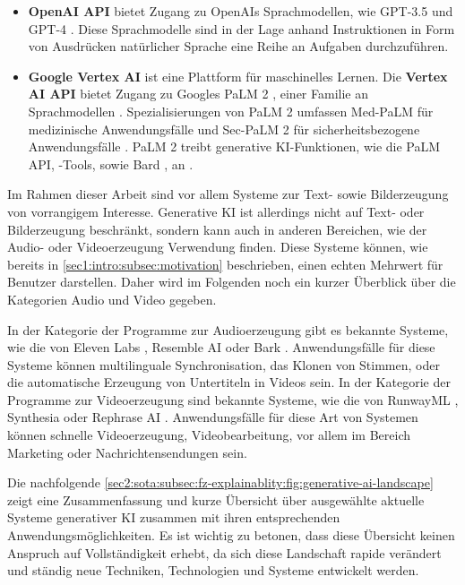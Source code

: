 \begin{itemize}
    \item \textbf{OpenAI API} bietet Zugang zu OpenAIs Sprachmodellen, wie GPT-3.5 \cite{openai-gpt-sep-2021} und GPT-4 \cite{openai-gpt-sep-2021}.
    Diese Sprachmodelle sind in der Lage anhand Instruktionen in Form von Ausdrücken natürlicher Sprache eine Reihe an Aufgaben durchzuführen.
    \item \textbf{Google Vertex AI} ist eine Plattform für maschinelles Lernen.
    Die \textbf{Vertex AI API} bietet Zugang zu Googles PaLM 2 \cite{google-palm2-techreport}, einer Familie an Sprachmodellen \cite{google-blog-io-23}.
    Spezialisierungen von PaLM 2 umfassen Med-PaLM für medizinische Anwendungsfälle und Sec-PaLM 2 für sicherheitsbezogene Anwendungsfälle \cite{google-blog-io-23}.
    PaLM 2 treibt generative KI-Funktionen, wie die PaLM API, -Tools, sowie Bard \cite{google-bard}, an \cite{google-blog-io-23}.
\end{itemize}

Im Rahmen dieser Arbeit sind vor allem Systeme zur Text- sowie Bilderzeugung von vorrangigem Interesse.
Generative KI ist allerdings nicht auf Text- oder Bilderzeugung beschränkt, sondern kann auch in anderen Bereichen, wie der Audio- oder Videoerzeugung Verwendung finden.
Diese Systeme können, wie bereits in \cref{sec1:intro:subsec:motivation} beschrieben, einen echten Mehrwert für Benutzer darstellen.
Daher wird im Folgenden noch ein kurzer Überblick über die Kategorien Audio und Video gegeben.

In der Kategorie der Programme zur Audioerzeugung gibt es bekannte Systeme, wie die von Eleven Labs \cite{eleven-labs}, Resemble AI \cite{resemble-ai} oder Bark \cite{bark}.
Anwendungsfälle für diese Systeme können multilinguale Synchronisation, das Klonen von Stimmen, oder die automatische Erzeugung von Untertiteln in Videos sein.
In der Kategorie der Programme zur Videoerzeugung sind bekannte Systeme, wie die von RunwayML \cite{runway-ml}, Synthesia \cite{synthesia} oder Rephrase AI \cite{rephrase-ai}.
Anwendungsfälle für diese Art von Systemen können schnelle Videoerzeugung, Videobearbeitung, vor allem im Bereich Marketing oder Nachrichtensendungen sein.

Die nachfolgende \cref{sec2:sota:subsec:fz-explainablity:fig:generative-ai-landscape} zeigt eine Zusammenfassung und kurze Übersicht über ausgewählte aktuelle Systeme generativer KI zusammen mit ihren entsprechenden Anwendungsmöglichkeiten.
Es ist wichtig zu betonen, dass diese Übersicht keinen Anspruch auf Vollständigkeit erhebt, da sich diese Landschaft rapide verändert und ständig neue Techniken, Technologien und Systeme entwickelt werden.

